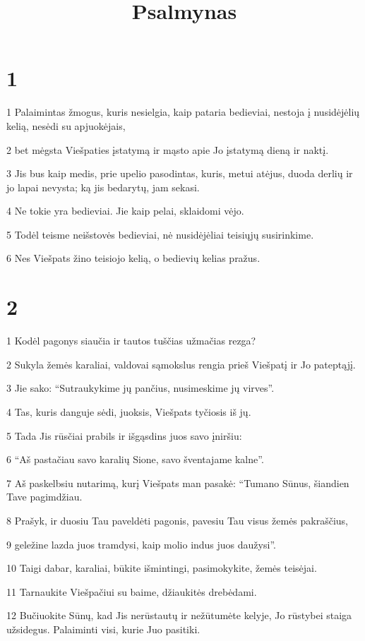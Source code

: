 

\title{Psalmynas}


\chapter{1}


\par 1 Palaimintas žmogus, kuris nesielgia, kaip pataria bedieviai, nestoja į nusidėjėlių kelią, nesėdi su apjuokėjais, 
\par 2 bet mėgsta Viešpaties įstatymą ir mąsto apie Jo įstatymą dieną ir naktį. 
\par 3 Jis bus kaip medis, prie upelio pasodintas, kuris, metui atėjus, duoda derlių ir jo lapai nevysta; ką jis bedarytų, jam sekasi. 
\par 4 Ne tokie yra bedieviai. Jie kaip pelai, sklaidomi vėjo. 
\par 5 Todėl teisme neišstovės bedieviai, nė nusidėjėliai teisiųjų susirinkime. 
\par 6 Nes Viešpats žino teisiojo kelią, o bedievių kelias pražus.


\chapter{2}


\par 1 Kodėl pagonys siaučia ir tautos tuščias užmačias rezga? 
\par 2 Sukyla žemės karaliai, valdovai sąmokslus rengia prieš Viešpatį ir Jo pateptąjį. 
\par 3 Jie sako: “Sutraukykime jų pančius, nusimeskime jų virves”. 
\par 4 Tas, kuris danguje sėdi, juoksis, Viešpats tyčiosis iš jų. 
\par 5 Tada Jis rūsčiai prabils ir išgąsdins juos savo įniršiu: 
\par 6 “Aš pastačiau savo karalių Sione, savo šventajame kalne”. 
\par 7 Aš paskelbsiu nutarimą, kurį Viešpats man pasakė: “Tu­mano Sūnus, šiandien Tave pagimdžiau. 
\par 8 Prašyk, ir duosiu Tau paveldėti pagonis, pavesiu Tau visus žemės pakraščius, 
\par 9 geležine lazda juos tramdysi, kaip molio indus juos daužysi”. 
\par 10 Taigi dabar, karaliai, būkite išmintingi, pasimokykite, žemės teisėjai. 
\par 11 Tarnaukite Viešpačiui su baime, džiaukitės drebėdami. 
\par 12 Bučiuokite Sūnų, kad Jis nerūstautų ir nežūtumėte kelyje, Jo rūstybei staiga užsidegus. Palaiminti visi, kurie Juo pasitiki.




